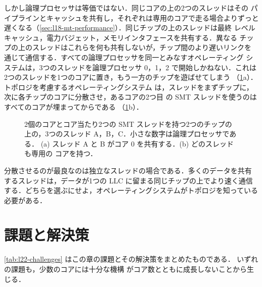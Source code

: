 \documentclass[../main.tex]{subfiles}
\begin{document}
しかし論理プロセッサは等価ではない．同じコアの上の2つのスレッドはその
パイプラインとキャッシュを共有し，それぞれは専用のコアで走る場合よりずっと
遅くなる（\cref{sec:l18-mt-performance}）．同じチップの上のスレッドは最終
レベルキャッシュ，電力バジェット，メモリインタフェースを共有する．異なる
チップの上のスレッドはこれらを何も共有しないが，チップ間のより遅いリンクを
通じて通信する．すべての論理プロセッサを同一とみなすオペレーティング
システムは，3つのスレッドを論理プロセッサ 0，1，2 で開始しかねない．これは
2つのスレッドを1つのコアに置き，もう一方のチップを遊ばせてしまう
（\cref{fig:l22-placement}a）．トポロジを考慮するオペレーティングシステム
は，スレッドをまずチップに，次に各チップのコアに分散させ，あるコアの2つ目
の SMT スレッドを使うのはすべてのコアが埋まってからである
（\cref{fig:l22-placement}b）．

\begin{figure}[htbp]
  \centering
  
  \caption{2個のコアとコア当たり2つの SMT スレッドを持つ2つのチップの
    上の，3つのスレッド A，B，C．小さな数字は論理プロセッサである．
    (a) スレッド A と B がコア 0 を共有する．(b) どのスレッドも専用の
    コアを持つ．}
  \label{fig:l22-placement}
\end{figure}

\begin{note}
  分散させるのが最良なのは独立なスレッドの場合である．多くのデータを共有
  するスレッドは，データが1つの LLC に留まる同じチップの上でより速く通信
  する．どちらを選ぶにせよ，オペレーティングシステムがトポロジを知っている
  必要がある．
\end{note}

\section{課題と解決策}
\label{sec:l22-summary}

\cref{tab:l22-challenges} はこの章の課題とその解決策をまとめたものである．
いずれの課題も，少数のコアには十分な機構
がコア数とともに成長しないことから生じる．
\end{document}
